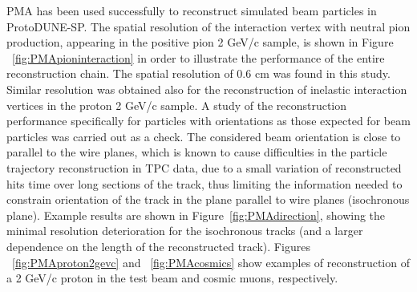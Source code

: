 PMA has been used successfully to reconstruct simulated beam particles in
ProtoDUNE-SP. The spatial resolution of the interaction vertex with neutral pion
production, appearing in the positive pion 2 GeV/c sample, is shown in Figure ~\ref{fig:PMApioninteraction}
in order to illustrate the performance of the entire reconstruction chain. The spatial resolution
of 0.6 cm was found in this study. Similar resolution was obtained also for the reconstruction
of inelastic interaction vertices in the proton 2 GeV/c sample. A study of the reconstruction performance
specifically for particles with orientations as those expected for beam particles was carried out as a check.
The considered beam orientation is close to parallel to the wire planes, which is known to cause difficulties
in the particle trajectory reconstruction in TPC data, due to a small variation of reconstructed hits time
over long sections of the track, thus limiting the information needed to constrain orientation of the track
in the plane parallel to wire planes (isochronous plane).
Example results are shown in
Figure~\ref{fig:PMAdirection}, showing the minimal resolution deterioration for the isochronous
tracks (and a larger dependence on the length of the reconstructed track). Figures ~\ref{fig:PMAproton2gevc}
and ~\ref{fig:PMAcosmics} show examples of reconstruction of a 2 GeV/c proton in the test beam and
cosmic muons, respectively.





